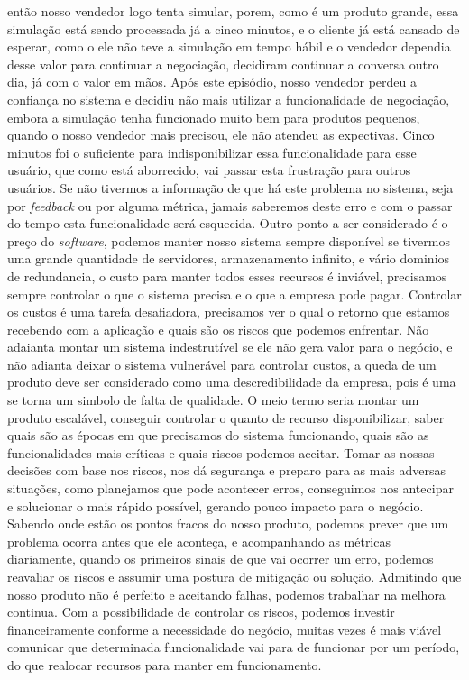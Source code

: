   então nosso vendedor logo tenta simular, porem, como é um produto grande, essa
  simulação está sendo processada já a cinco minutos, e o cliente já está cansado
  de esperar, como o ele não teve a simulação em tempo hábil e o vendedor dependia
  desse valor para continuar a negociação, decidiram continuar a conversa outro dia,
  já com o valor em mãos. Após este episódio, nosso vendedor perdeu a confiança
  no sistema e decidiu não mais utilizar a funcionalidade de negociação, embora a
  simulação tenha funcionado muito bem para produtos pequenos, quando o nosso
  vendedor mais precisou, ele não atendeu as expectivas. Cinco minutos foi o
  suficiente para indisponibilizar essa funcionalidade para esse usuário, que
  como está aborrecido, vai passar esta frustração para outros usuários. Se não
  tivermos a informação de que há este problema no sistema, seja por \textit{feedback}
  ou por alguma métrica, jamais saberemos deste erro e com o passar do tempo
  esta funcionalidade será esquecida. \newline
  Outro ponto a ser considerado é o preço do \textit{software}, podemos manter
  nosso sistema sempre disponível se tivermos uma grande quantidade de servidores,
  armazenamento infinito, e vário dominios de redundancia, o custo para manter
  todos esses recursos é inviável, precisamos sempre controlar o que o sistema
  precisa e o que a empresa pode pagar. Controlar os custos é uma tarefa
  desafiadora, precisamos ver o qual o retorno que estamos recebendo com a aplicação
  e quais são os riscos que podemos enfrentar. Não adaianta montar um sistema
  indestrutível se ele não gera valor para o negócio, e não adianta deixar o
  sistema vulnerável para controlar custos, a queda de um produto deve ser
  considerado como uma descredibilidade da empresa, pois é uma se torna um
  simbolo de falta de qualidade. O meio termo seria montar um produto escalável,
  conseguir controlar o quanto de recurso disponibilizar, saber quais são as
  épocas em que precisamos do sistema funcionando, quais são as funcionalidades
  mais críticas e quais riscos podemos aceitar. Tomar as nossas decisões com
  base nos riscos, nos dá segurança e preparo para as mais adversas situações,
  como planejamos que pode acontecer erros, conseguimos nos antecipar e solucionar
  o mais rápido possível, gerando pouco impacto para o negócio. Sabendo onde estão
  os pontos fracos do nosso produto, podemos prever que um problema ocorra antes
  que ele aconteça, e acompanhando as métricas diariamente, quando os primeiros
  sinais de que vai ocorrer um erro, podemos reavaliar os riscos e assumir uma
  postura de mitigação ou solução. Admitindo que nosso produto não é perfeito e
  aceitando falhas, podemos trabalhar na melhora continua. Com a possibilidade
  de controlar os riscos, podemos investir financeiramente conforme a necessidade
  do negócio, muitas vezes é mais viável comunicar que determinada funcionalidade
  vai para de funcionar por um período, do que realocar recursos para manter em
  funcionamento.

